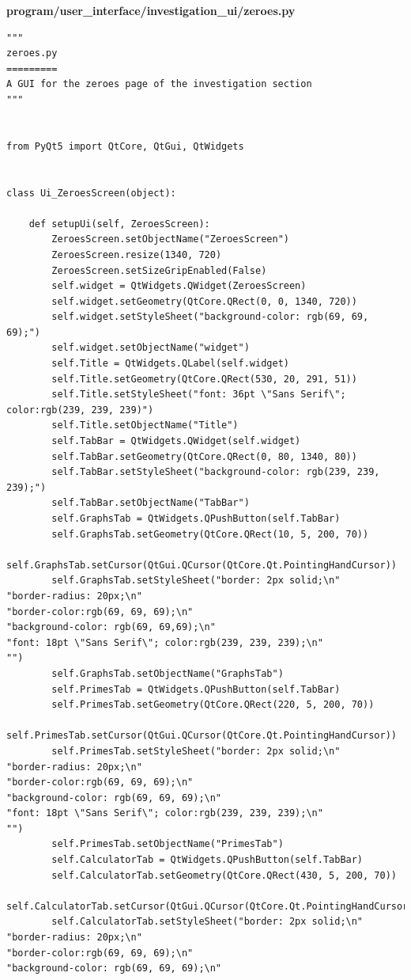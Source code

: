 \documentclass[12pt]{article}
\begin{document}
\clearpage
\textbf{program/user\_interface/investigation\_ui/zeroes.py}
\begin{lstlisting}
"""
zeroes.py
=========
A GUI for the zeroes page of the investigation section
"""


from PyQt5 import QtCore, QtGui, QtWidgets


class Ui_ZeroesScreen(object):

    def setupUi(self, ZeroesScreen):
        ZeroesScreen.setObjectName("ZeroesScreen")
        ZeroesScreen.resize(1340, 720)
        ZeroesScreen.setSizeGripEnabled(False)
        self.widget = QtWidgets.QWidget(ZeroesScreen)
        self.widget.setGeometry(QtCore.QRect(0, 0, 1340, 720))
        self.widget.setStyleSheet("background-color: rgb(69, 69, 69);")
        self.widget.setObjectName("widget")
        self.Title = QtWidgets.QLabel(self.widget)
        self.Title.setGeometry(QtCore.QRect(530, 20, 291, 51))
        self.Title.setStyleSheet("font: 36pt \"Sans Serif\"; color:rgb(239, 239, 239)")
        self.Title.setObjectName("Title")
        self.TabBar = QtWidgets.QWidget(self.widget)
        self.TabBar.setGeometry(QtCore.QRect(0, 80, 1340, 80))
        self.TabBar.setStyleSheet("background-color: rgb(239, 239, 239);")
        self.TabBar.setObjectName("TabBar")
        self.GraphsTab = QtWidgets.QPushButton(self.TabBar)
        self.GraphsTab.setGeometry(QtCore.QRect(10, 5, 200, 70))
        self.GraphsTab.setCursor(QtGui.QCursor(QtCore.Qt.PointingHandCursor))
        self.GraphsTab.setStyleSheet("border: 2px solid;\n"
"border-radius: 20px;\n"
"border-color:rgb(69, 69, 69);\n"
"background-color: rgb(69, 69,69);\n"
"font: 18pt \"Sans Serif\"; color:rgb(239, 239, 239);\n"
"")
        self.GraphsTab.setObjectName("GraphsTab")
        self.PrimesTab = QtWidgets.QPushButton(self.TabBar)
        self.PrimesTab.setGeometry(QtCore.QRect(220, 5, 200, 70))
        self.PrimesTab.setCursor(QtGui.QCursor(QtCore.Qt.PointingHandCursor))
        self.PrimesTab.setStyleSheet("border: 2px solid;\n"
"border-radius: 20px;\n"
"border-color:rgb(69, 69, 69);\n"
"background-color: rgb(69, 69, 69);\n"
"font: 18pt \"Sans Serif\"; color:rgb(239, 239, 239);\n"
"")
        self.PrimesTab.setObjectName("PrimesTab")
        self.CalculatorTab = QtWidgets.QPushButton(self.TabBar)
        self.CalculatorTab.setGeometry(QtCore.QRect(430, 5, 200, 70))
        self.CalculatorTab.setCursor(QtGui.QCursor(QtCore.Qt.PointingHandCursor))
        self.CalculatorTab.setStyleSheet("border: 2px solid;\n"
"border-radius: 20px;\n"
"border-color:rgb(69, 69, 69);\n"
"background-color: rgb(69, 69, 69);\n"

\end{lstlisting}
\end{document}
